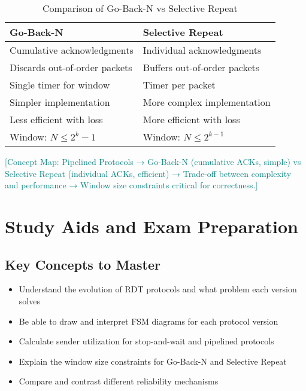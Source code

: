 \documentclass[12pt]{article}
\begin{document}
\begin{table}[h]
    \centering
    \begin{tabular}{p{}p{}}
        \toprule
        \textbf{Go-Back-N}            & \textbf{Selective Repeat}    \\
        \midrule
        Cumulative acknowledgments    & Individual acknowledgments   \\
        Discards out-of-order packets & Buffers out-of-order packets \\
        Single timer for window       & Timer per packet             \\
        Simpler implementation        & More complex implementation  \\
        Less efficient with loss      & More efficient with loss     \\
        Window: $N \leq 2^k - 1$      & Window: $N \leq 2^{k-1}$     \\
        \bottomrule
    \end{tabular}
    \caption{Comparison of Go-Back-N vs Selective Repeat}
    \label{tab:gbn_vs_sr}
\end{table}

\textcolor{teal}{[Concept Map: Pipelined Protocols → Go-Back-N (cumulative ACKs, simple) vs Selective Repeat (individual ACKs, efficient) → Trade-off between complexity and performance → Window size constraints critical for correctness.]}

\section{Study Aids and Exam Preparation}

\subsection{Key Concepts to Master}
\begin{itemize}
    \item Understand the evolution of RDT protocols and what problem each version solves
    \item Be able to draw and interpret FSM diagrams for each protocol version
    \item Calculate sender utilization for stop-and-wait and pipelined protocols
    \item Explain the window size constraints for Go-Back-N and Selective Repeat
    \item Compare and contrast different reliability mechanisms
\end{itemize}
\end{document}
